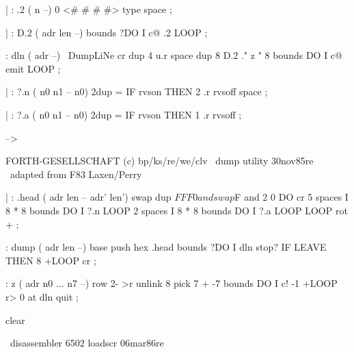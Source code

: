 | : .2  ( n --)                          
 0 <# # # #> type space ;                
                                         
| : D.2  ( adr len --)                   
 bounds ?DO  I c@ .2  LOOP ;             
                                         
: dln  ( adr --)  \ DumpLiNe             
 cr  dup 4 u.r  space  dup 8 D.2         
 ." z "  8 bounds DO  I c@ emit  LOOP ;  
                                         
| : ?.n  ( n0 n1 -- n0)                  
 2dup = IF  rvson  THEN                  
 2 .r  rvsoff  space ;                   
                                         
| : ?.a  ( n0 n1 -- n0)                  
 2dup = IF  rvson  THEN  1 .r rvsoff ;   
                                         
-->                                      
                                         
                                         
                                         
FORTH-GESELLSCHAFT  (c) bp/ks/re/we/clv 
\ dump utility                30nov85re  
\ adapted from F83 Laxen/Perry           
                                         
| : .head  ( adr len -- adr' len')       
 swap  dup $FFF0 and  swap $F and        
 2 0 DO  cr 5 spaces                     
  I 8 * 8 bounds DO I ?.n LOOP 2 spaces  
  I 8 * 8 bounds DO I ?.a LOOP           
 LOOP  rot + ;                           
                                         
: dump  ( adr len --)                    
 base push  hex  .head                   
 bounds ?DO  I dln  stop? IF LEAVE THEN  
             8 +LOOP cr ;                
                                         
: z  ( adr n0 ... n7 --)                 
 row 2- >r  unlink                       
 8 pick 7 + -7 bounds                    
 DO  I c!  -1 +LOOP r> 0 at dln  quit ;  
                                         
                                         
clear                                    
                                         
                                         
                                        
\ disassembler 6502 loadscr    06mar86re 
                                         
